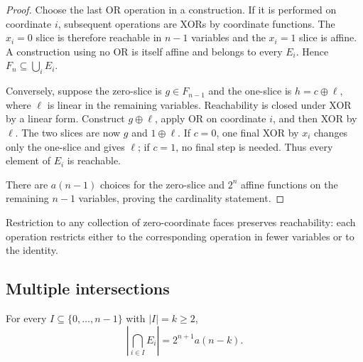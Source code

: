 \begin{proof}
Choose the last OR operation in a construction.  If it is performed on
coordinate \(i\), subsequent operations are XORs by coordinate functions.
The \(x_i=0\) slice is therefore reachable in \(n-1\) variables and the
\(x_i=1\) slice is affine.  A construction using no OR is itself affine and
belongs to every \(E_i\).  Hence \(F_n\subseteq\bigcup_iE_i\).

Conversely, suppose the zero-slice is \(g\in F_{n-1}\) and the one-slice is
\(h=c\oplus\ell\), where \(\ell\) is linear in the remaining variables.
Reachability is closed under XOR by a linear form.  Construct
\(g\oplus\ell\), apply OR on coordinate \(i\), and then XOR by \(\ell\).
The two slices are now \(g\) and \(1\oplus\ell\).  If \(c=0\), one final XOR
by \(x_i\) changes only the one-slice and gives \(\ell\); if \(c=1\), no final
step is needed.  Thus every element of \(E_i\) is reachable.

There are \(a(n-1)\) choices for the zero-slice and \(2^n\) affine functions
on the remaining \(n-1\) variables, proving the cardinality statement.
\end{proof}

Restriction to any collection of zero-coordinate faces preserves
reachability: each operation restricts either to the corresponding operation in
fewer variables or to the identity.

\subsection{Multiple intersections}

\begin{lemma}
\label{lem:a005787-intersection}
For every \(I\subseteq\{0,\ldots,n-1\}\) with \(|I|=k\ge2\),
\begin{equation}
 \left|\bigcap_{i\in I}E_i\right|=2^{n+1}a(n-k).
 \label{eq:a005787-intersection}
\end{equation}
\end{lemma}

